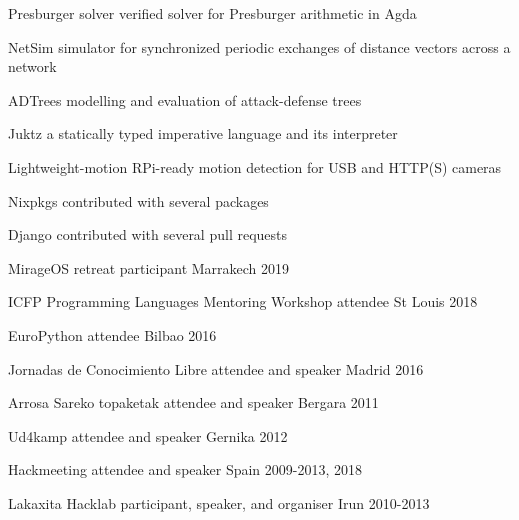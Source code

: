 \documentclass[11pt, a4paper]{awesome-cv}
\begin{document}

\begin{cvskills}
    \cvskill
        {Presburger solver}
        {verified solver for Presburger arithmetic in Agda}

    \cvskill
        {NetSim}
        {simulator for synchronized periodic exchanges of distance vectors
        across a network}

    \cvskill
        {ADTrees}
        {modelling and evaluation of attack-defense trees}

    \cvskill
        {Juktz}
        {a statically typed imperative language and its interpreter}

    \cvskill
        {Lightweight-motion}
        {RPi-ready motion detection for USB and HTTP(S) cameras}

    \cvskill
        {Nixpkgs}
        {contributed with several packages}

    \cvskill
        {Django}
        {contributed with several pull requests}
\end{cvskills}


\begin{cvhonors}
    \cvhonor
      {MirageOS retreat}
      {participant}
      {Marrakech}
      {2019}

    \cvhonor
      {ICFP}
      {Programming Languages Mentoring Workshop attendee}
      {St Louis}
      {2018}

    \cvhonor
      {EuroPython}
      {attendee}
      {Bilbao}
      {2016}

    \cvhonor
      {Jornadas de Conocimiento Libre}
      {attendee and speaker}
      {Madrid}
      {2016}

    \cvhonor
      {Arrosa Sareko topaketak}
      {attendee and speaker}
      {Bergara}
      {2011}

    \cvhonor
      {Ud4kamp}
      {attendee and speaker}
      {Gernika}
      {2012}

    \cvhonor
      {Hackmeeting}
      {attendee and speaker}
      {Spain}
      {2009-2013, 2018}
  
    \cvhonor
      {Lakaxita Hacklab}
      {participant, speaker, and organiser}
      {Irun}
      {2010-2013}
\end{cvhonors}

\end{document}
